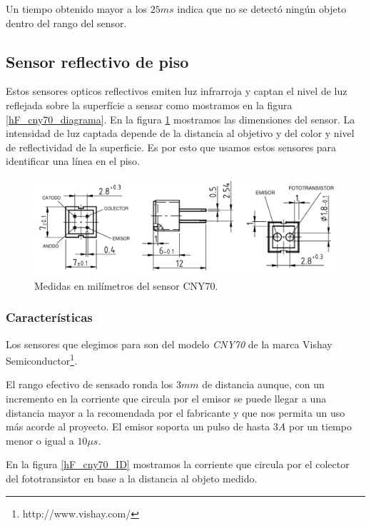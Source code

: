 Un tiempo obtenido mayor a los $25ms$ indica que no se detect\'o ning\'un objeto dentro del rango del sensor.

\subsection{Sensor reflectivo de piso}
\label{h_sensado_piso}

Estos sensores opticos reflectivos emiten luz infrarroja y captan el nivel de luz reflejada sobre la superf\'icie a sensar
como mostramos en la figura \ref{hF_cny70_diagrama}.
En la figura \ref{hF_cny70_dim} mostramos las dimensiones del sensor.
La intensidad de luz captada depende de la distancia al objetivo y del color y nivel de reflectividad de la superficie.
Es por esto que usamos estos sensores para identificar una l\'inea en el piso.

\begin{figure}[ht]
	\centering
	\includegraphics[scale=0.25]{figuras/cny70_dim.png}
	\caption{Medidas en mil\'imetros del sensor CNY70.}
	\label{hF_cny70_dim}
\end{figure}

\subsubsection{Caracter\'isticas}
\label{h_sensado_piso_caracteristicas}

Los sensores que elegimos para son del modelo \emph{CNY70} de la marca Vishay Semiconductor\footnote{http://www.vishay.com/}.

El rango efectivo de sensado ronda los $3 mm$ de distancia aunque, con un incremento en la corriente que circula por el emisor
se puede llegar a una distancia mayor a la recomendada por el fabricante y que nos permita un uso m\'as acorde al proyecto.
El emisor soporta un pulso de hasta $3 A$ por un tiempo menor o igual a $10\mu s$.

En la figura \ref{hF_cny70_ID} mostramos la corriente que circula por el colector del fototransistor en base a la distancia al objeto medido.

